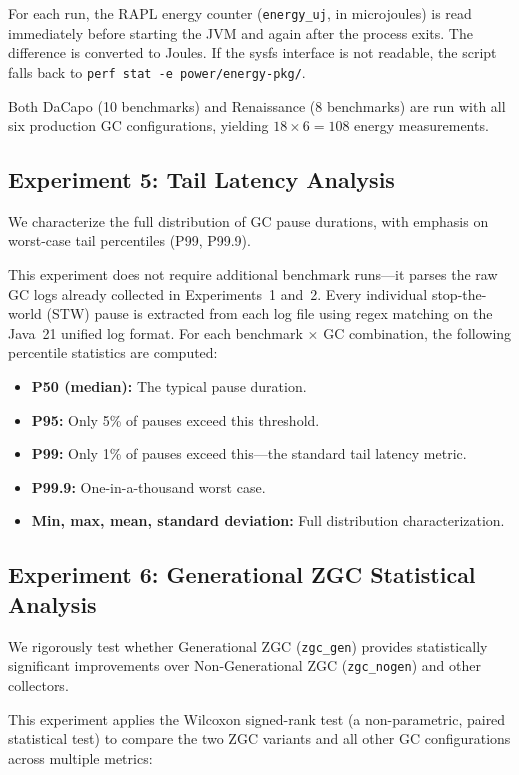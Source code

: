 For each run, the RAPL energy counter (\texttt{energy\_uj}, in microjoules) is read immediately before starting the JVM and again after the process exits. The difference is converted to Joules. If the sysfs interface is not readable, the script falls back to \texttt{perf stat -e power/energy-pkg/}.

Both DaCapo (10 benchmarks) and Renaissance (8 benchmarks) are run with all six production GC configurations, yielding $18 \times 6 = 108$ energy measurements.

\subsection{Experiment 5: Tail Latency Analysis}

We characterize the full distribution of GC pause durations, with emphasis on worst-case tail percentiles (P99, P99.9).

This experiment does not require additional benchmark runs---it parses the raw GC logs already collected in Experiments~1 and~2. Every individual stop-the-world (STW) pause is extracted from each log file using regex matching on the Java~21 unified log format. For each benchmark $\times$ GC combination, the following percentile statistics are computed:

\begin{itemize}
\item \textbf{P50 (median):} The typical pause duration.
\item \textbf{P95:} Only 5\% of pauses exceed this threshold.
\item \textbf{P99:} Only 1\% of pauses exceed this---the standard tail latency metric.
\item \textbf{P99.9:} One-in-a-thousand worst case.
\item \textbf{Min, max, mean, standard deviation:} Full distribution characterization.
\end{itemize}

\subsection{Experiment 6: Generational ZGC Statistical Analysis}

We rigorously test whether Generational ZGC (\texttt{zgc\_gen}) provides statistically significant improvements over Non-Generational ZGC (\texttt{zgc\_nogen}) and other collectors.

This experiment applies the Wilcoxon signed-rank test (a non-parametric, paired statistical test) to compare the two ZGC variants and all other GC configurations across multiple metrics:

